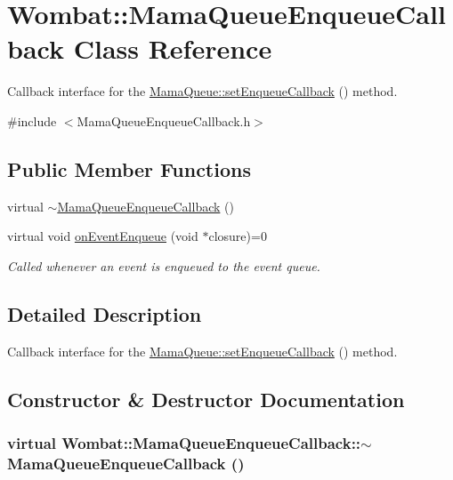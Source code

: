 \hypertarget{classWombat_1_1MamaQueueEnqueueCallback}{
\section{Wombat::MamaQueueEnqueueCallback Class Reference}
\label{classWombat_1_1MamaQueueEnqueueCallback}
}


Callback interface for the \hyperlink{classWombat_1_1MamaQueue_a852c925667c07e8bd0b3bc8cf30f4986}{MamaQueue::setEnqueueCallback} () method.  


{\ttfamily \#include $<$MamaQueueEnqueueCallback.h$>$}\subsection*{Public Member Functions}
\begin{DoxyCompactItemize}
\item 
virtual \hyperlink{classWombat_1_1MamaQueueEnqueueCallback_a85d6d46198292c5932fb8fc727b2f2a9}{$\sim$MamaQueueEnqueueCallback} ()
\item 
virtual void \hyperlink{classWombat_1_1MamaQueueEnqueueCallback_a7377a77ca8556b9621233ba5c729c0ba}{onEventEnqueue} (void $\ast$closure)=0
\begin{DoxyCompactList}\small\item\em Called whenever an event is enqueued to the event queue. \item\end{DoxyCompactList}\end{DoxyCompactItemize}


\subsection{Detailed Description}
Callback interface for the \hyperlink{classWombat_1_1MamaQueue_a852c925667c07e8bd0b3bc8cf30f4986}{MamaQueue::setEnqueueCallback} () method. 

\subsection{Constructor \& Destructor Documentation}
\hypertarget{classWombat_1_1MamaQueueEnqueueCallback_a85d6d46198292c5932fb8fc727b2f2a9}{
\subsubsection[{$\sim$MamaQueueEnqueueCallback}]{\setlength{\rightskip}{0pt plus 5cm}virtual Wombat::MamaQueueEnqueueCallback::$\sim$MamaQueueEnqueueCallback ()}}
\label{classWombat_1_1MamaQueueEnqueueCallback_a85d6d46198292c5932fb8fc727b2f2a9}


